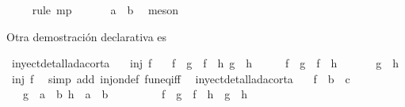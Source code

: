 \begin{isabellebody}
\ {}\ {}\ \isamarkupfalse%
\ {\isacharparenleft}rule\ mp{\isacharparenright}\isanewline
\ \ \isamarkupfalse%
\ \isamarkupfalse%
\ {\isachardoublequoteopen}\ a\ {\isacharequal}\ b{\isachardoublequoteclose}\ \isamarkupfalse%
\ meson\isanewline
{}\isamarkupfalse%
%
\endisatagproof
{\isafoldproof}%
%
\isadelimproof
%
\endisadelimproof
%
\begin{isamarkuptext}%
Otra demostración declarativa es%
\end{isamarkuptext}\isamarkuptrue%
\isamarkupfalse%
\ inyectdetalladacorta{}{\isacharcolon}\isanewline
\ \ \ {\isachardoublequoteopen}inj\ f{\isachardoublequoteclose}\isanewline
\ \ \ {\isachardoublequoteopen}{\isacharparenleft}f\ {\isasymcirc}\ g\ {\isacharequal}\ f\ {\isasymcirc}\ h{\isacharparenright}\ {\isasymlongrightarrow}{\isacharparenleft}g\ {\isacharequal}\ h{\isacharparenright}{\isachardoublequoteclose}\isanewline
%
\isadelimproof
%
\endisadelimproof
%
\isatagproof
{}\isamarkupfalse%
\ \isanewline
\ \ \isamarkupfalse%
\ {\isachardoublequoteopen}f\ {\isasymcirc}\ g\ {\isacharequal}\ f\ {\isasymcirc}\ h{\isachardoublequoteclose}\ \isanewline
\ \ \isamarkupfalse%
\ \isamarkupfalse%
\ {\isachardoublequoteopen}g\ {\isacharequal}\ h{\isachardoublequoteclose}\ \isamarkupfalse%
\ {\isacharbackquoteopen}inj\ f{\isacharbackquoteclose}\ \isamarkupfalse%
\ {\isacharparenleft}simp\ add{\isacharcolon}\ inj{\isacharunderscore}on{\isacharunderscore}def\ fun{\isacharunderscore}eq{\isacharunderscore}iff{\isacharparenright}\ \isanewline
{}\isamarkupfalse%
%
\endisatagproof
{\isafoldproof}%
%
\isadelimproof
\isanewline
%
\endisadelimproof
\isanewline
{}\isamarkupfalse%
\ inyectdetalladacorta{}{\isacharcolon}\isanewline
\ \ \ f\ {\isacharcolon}{\isacharcolon}\ {\isachardoublequoteopen}{\isacharprime}b\ {\isasymRightarrow}\ {\isacharprime}c{\isachardoublequoteclose}\ \isanewline
\ \ \ {\isachardoublequoteopen}{\isasymforall}{\isacharparenleft}g\ {\isacharcolon}{\isacharcolon}\ {\isacharprime}a\ {\isasymRightarrow}\ {\isacharprime}b{\isacharparenright}\ {\isacharparenleft}h\ {\isacharcolon}{\isacharcolon}\ {\isacharprime}a\ {\isasymRightarrow}\ {\isacharprime}b{\isacharparenright}{\isachardot}\isanewline
\ \ \ \ \ \ \ \ \ {\isacharparenleft}f\ {\isasymcirc}\ g\ {\isacharequal}\ f\ {\isasymcirc}\ h\ {\isasymlongrightarrow}\ g\ {\isacharequal}\ h{\isacharparenright}{\isachardoublequoteclose}\isanewline

\end{isabellebody}
